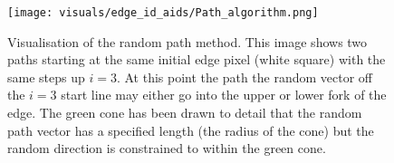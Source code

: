 \documentclass[11pt]{article}
\begin{document}
\begin{figure}[h!]
\centering
\texttt{[image: visuals/edge\_id\_aids/Path\_algorithm.png]}
\caption{\small{Visualisation of the random path method. This image shows two paths starting at the same initial edge pixel (white square) with the same steps up $i=3$. At this point the path the random vector off the $i=3$ start line may either go into the upper or lower fork of the edge. The green cone has been drawn to detail that the random path vector has a specified length (the radius of the cone) but the random direction is constrained to within the green cone.}}
\label{singleField_PtPlot_fig}
\end{figure}
\end{document}
